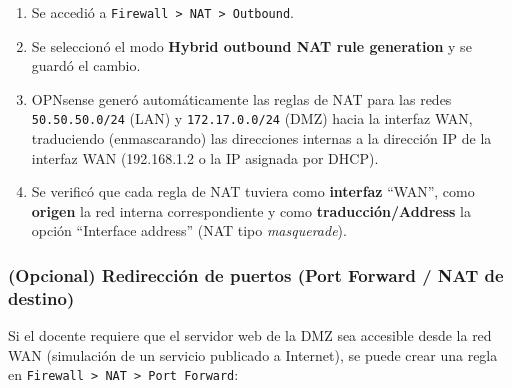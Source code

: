 \documentclass{article}
\providecommand{\tightlist}{%
  \setlength{\itemsep}{0pt}\setlength{\parskip}{0pt}}
\renewcommand{\_}{\oldunderscore\hskip0pt\relax}
\begin{document}
\begin{enumerate}
\def\labelenumi{\arabic{enumi}.}
\tightlist
\item
  Se accedió a
  \texttt{Firewall\ \textgreater{}\ NAT\ \textgreater{}\ Outbound}.
\item
  Se seleccionó el modo \textbf{Hybrid outbound NAT rule generation} y
  se guardó el cambio.
\item
  OPNsense generó automáticamente las reglas de NAT para las redes
  \texttt{50.50.50.0/24} (LAN) y \texttt{172.17.0.0/24} (DMZ) hacia la
  interfaz WAN, traduciendo (enmascarando) las direcciones internas a la
  dirección IP de la interfaz WAN (192.168.1.2 o la IP asignada por
  DHCP).
\item
  Se verificó que cada regla de NAT tuviera como \textbf{interfaz}
  ``WAN'', como \textbf{origen} la red interna correspondiente y como
  \textbf{traducción/Address} la opción ``Interface address'' (NAT tipo
  \emph{masquerade}).
\end{enumerate}

\hypertarget{opcional-redirecciuxf3n-de-puertos-port-forward-nat-de-destino}{%
\subsubsection{(Opcional) Redirección de puertos (Port Forward / NAT de
destino)}\label{opcional-redirecciuxf3n-de-puertos-port-forward-nat-de-destino}}

Si el docente requiere que el servidor web de la DMZ sea accesible desde
la red WAN (simulación de un servicio publicado a Internet), se puede
crear una regla en
\texttt{Firewall\ \textgreater{}\ NAT\ \textgreater{}\ Port\ Forward}:
\end{document}
